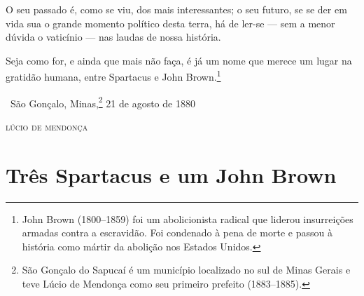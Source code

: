 O seu passado é, como se viu, dos mais interessantes; o seu futuro, se
se der em vida sua o grande momento político desta terra, há de ler-se
--- sem a menor dúvida o vaticínio --- nas laudas de nossa história.

Seja como for, e ainda que mais não faça, é já um nome que merece um
lugar na gratidão humana, entre Spartacus e John Brown.\footnote{John
  Brown (1800--1859) foi um abolicionista radical que liderou \label{brown}
  insurreições armadas contra a escravidão. Foi condenado à pena de
  morte e passou à história como mártir da abolição nos Estados Unidos.}

\medskip

\hfill\ São Gonçalo, Minas,\footnote{São Gonçalo do Sapucaí é um município
  localizado no sul de Minas Gerais e teve Lúcio de Mendonça como seu
  primeiro prefeito (1883--1885).} 21 de agosto de 1880

\hfill\textsc{lúcio de mendonça}

\part{Três Spartacus e um John Brown}


